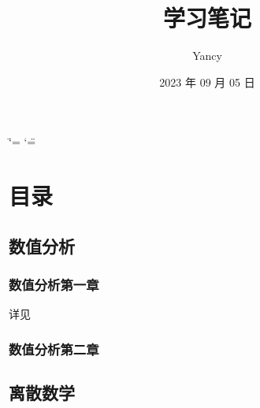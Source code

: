\documentclass[letterpaper,10pt,english]{sphinxmanual}
\title{学习笔记}
\date{2023 年 09 月 05 日}
\author{Yancy}
\begin{document}
\ifdefined\shorthandoff
  \ifnum\catcode`\=\string=\active\shorthandoff{=}\fi
  \ifnum\catcode`\"=\active{}\fi
\fi

\pagestyle{empty}
\sphinxmaketitle
\pagestyle{plain}
\sphinxtableofcontents
\pagestyle{normal}
\label{\detokenize{index::doc}}


\sphinxstepscope


\chapter{目录}
\label{\detokenize{list:id1}}\label{\detokenize{list::doc}}

\section{数值分析}
\label{\detokenize{list:id2}}

\subsection{数值分析第一章}
\label{\detokenize{list:id3}}
\sphinxAtStartPar
详见{\hyperref[\detokenize{files/Chap1::doc}]{}}


\subsection{数值分析第二章}
\label{\detokenize{list:id4}}

\section{离散数学}
\label{\detokenize{list:id5}}
\sphinxstepscope
\end{document}
